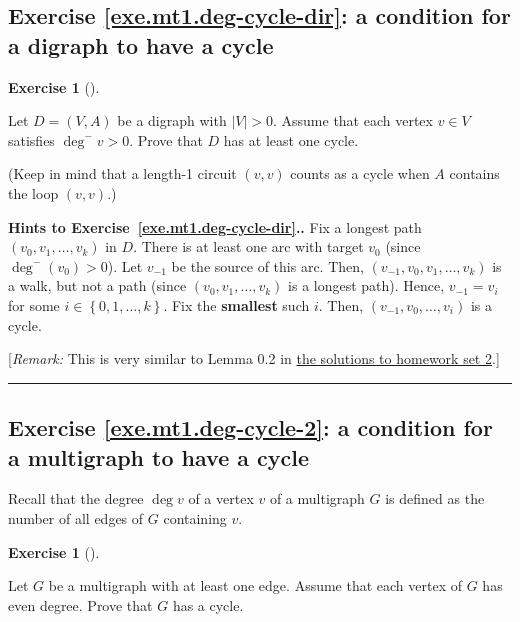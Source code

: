 \documentclass[numbers=enddot,12pt,final,onecolumn,notitlepage]{scrartcl}%
\newcounter{exer}
\theoremstyle{definition}
\newtheorem{exmp}[exer]{Exercise}
\newenvironment{exercise}[1][]
{\begin{exmp}[#1]\begin{leftbar}}
{\end{leftbar}\end{exmp}}
\newenvironment{proof}[1][Proof]{\noindent\textbf{#1.} }{\ \rule{0.5em}{0.5em}}
\newcommand{\set}[1]{\left\{ #1 \right\}}
\newcommand{\abs}[1]{\left| #1 \right|}
\newcommand{\tup}[1]{\left( #1 \right)}
\begin{document}
\subsection{Exercise \ref{exe.mt1.deg-cycle-dir}: a condition for a
digraph to have a cycle}

\begin{exercise} \label{exe.mt1.deg-cycle-dir}
Let $D = \tup{V, A}$ be a digraph with $\abs{V} > 0$. Assume
that each vertex $v \in V$ satisfies $\deg^- v > 0$. Prove that
$D$ has at least one cycle.

(Keep in mind that a length-1 circuit $\tup{v, v}$ counts as a cycle
when $A$ contains the loop $\tup{v, v}$.)
\end{exercise}

\begin{proof}[Hints to Exercise~\ref{exe.mt1.deg-cycle-dir}.]
Fix a longest path $\tup{v_0, v_1, \ldots, v_k}$ in $D$.
There is at least one arc with target
$v_0$ (since $\deg^- \tup{v_0} > 0$). Let $v_{-1}$ be the source of
this arc. Then, $\tup{v_{-1}, v_0, v_1, \ldots, v_k}$ is a walk, but
not a path (since $\tup{v_0, v_1, \ldots, v_k}$ is a longest path).
Hence, $v_{-1} = v_i$ for some $i \in \set{0, 1, \ldots, k}$.
Fix the \textbf{smallest} such $i$.
Then, $\tup{v_{-1}, v_0, \ldots, v_i}$ is a cycle.

[\textit{Remark:} This is very similar to Lemma 0.2 in
\href{http://www.cip.ifi.lmu.de/~grinberg/t/17s/hw2s.pdf}{the solutions to homework set 2}.]
\end{proof}

\subsection{Exercise \ref{exe.mt1.deg-cycle-2}: a condition for a
multigraph to have a cycle}

Recall that the degree $\deg v$ of a vertex $v$ of a multigraph $G$
is defined as the number of all edges of $G$ containing $v$.

\begin{exercise} \label{exe.mt1.deg-cycle-2}
Let $G$ be a multigraph with at least one edge.
Assume that each vertex of $G$ has even degree.
Prove that $G$ has a cycle.
\end{exercise}
\end{document}
